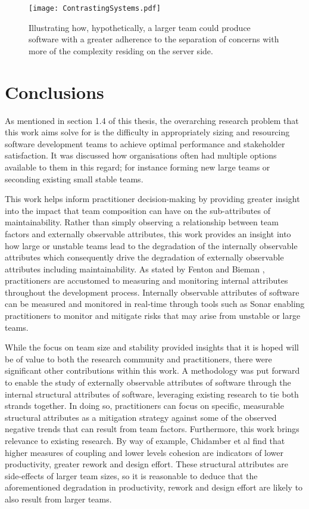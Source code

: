 \begin{itemize}
\end{itemize}

\begin{figure}[htbp!] 
\centering
\texttt{[image: ContrastingSystems.pdf]}
\caption{Illustrating how, hypothetically, a larger team could produce software with a greater adherence to the separation of concerns with more of the complexity residing on the server side.}
\label{fig:ContrastingSystems}
\end{figure}

\section{Conclusions} %
As mentioned in section 1.4 of this thesis, the overarching research problem that this work aims solve for is the difficulty in appropriately sizing and resourcing software development teams to achieve optimal performance and stakeholder satisfaction. It was discussed how organisations often had multiple options available to them in this regard; for instance forming new large teams or seconding existing small stable teams. 

This work helps inform practitioner decision-making by providing greater insight into the impact that team composition can have on the sub-attributes of maintainability. Rather than simply observing a relationship between team factors and externally observable attributes, this work provides an insight into how large or unstable teams lead to the degradation of the internally observable attributes which consequently drive the degradation of externally observable attributes including maintainability. As stated by Fenton and Bieman \citep{fenton2014software}, practitioners are accustomed to measuring and monitoring internal attributes throughout the development process. Internally observable attributes of software can be measured and monitored in real-time through tools such as Sonar enabling practitioners to monitor and mitigate risks that may arise from unstable or large teams.

While the focus on team size and stability provided insights that it is hoped will be of value to both the research community and practitioners, there were significant other contributions within this work. A methodology was put forward to enable the study of externally observable attributes of software through the internal structural attributes of software, leveraging existing research to tie both strands together. In doing so, practitioners can focus on specific, measurable structural attributes as a mitigation strategy against some of the observed negative trends that can result from team factors. Furthermore, this work brings relevance to existing research. By way of example, Chidamber et al \citep{chidamber1998managerial} find that higher measures of coupling and lower levels cohesion are indicators of lower productivity, greater rework and design effort. These structural attributes are side-effects of larger team sizes, so it is reasonable to deduce that the aforementioned degradation in productivity, rework and design effort are likely to also result from larger teams.


